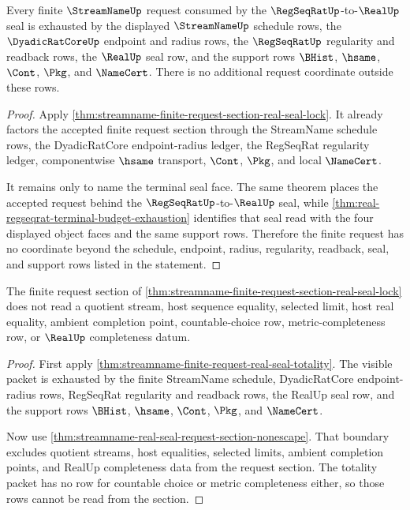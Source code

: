 \begin{theorem}
\label{thm:streamname-finite-request-real-seal-totality}
Every finite $\StreamNameUp$ request consumed by the
$\RegSeqRatUp$-to-$\RealUp$ seal is exhausted by the displayed
$\StreamNameUp$ schedule rows, the $\DyadicRatCoreUp$ endpoint and radius
rows, the $\RegSeqRatUp$ regularity and readback rows, the $\RealUp$ seal row,
and the support rows $\BHist$, $\hsame$, $\Cont$, $\Pkg$, and $\NameCert$.
There is no additional request coordinate outside these rows.
\end{theorem}
\begin{proof}
Apply \autoref{thm:streamname-finite-request-section-real-seal-lock}. It
already factors the accepted finite request section through the StreamName
schedule rows, the DyadicRatCore endpoint-radius ledger, the RegSeqRat
regularity ledger, componentwise $\hsame$ transport, $\Cont$, $\Pkg$, and
local $\NameCert$.

It remains only to name the terminal seal face. The same theorem places the
accepted request behind the $\RegSeqRatUp$-to-$\RealUp$ seal, while
\autoref{thm:real-regseqrat-terminal-budget-exhaustion} identifies that seal
read with the four displayed object faces and the same support rows.
Therefore the finite request has no coordinate beyond the schedule, endpoint,
radius, regularity, readback, seal, and support rows listed in the statement.
\end{proof}

\begin{theorem}
\label{thm:streamname-request-section-nonescape}
The finite request section of
\autoref{thm:streamname-finite-request-section-real-seal-lock} does not read a
quotient stream, host sequence equality, selected limit, host real equality,
ambient completion point, countable-choice row, metric-completeness row, or
$\RealUp$ completeness datum.
\end{theorem}
\begin{proof}
First apply
\autoref{thm:streamname-finite-request-real-seal-totality}. The visible packet
is exhausted by the finite StreamName schedule, DyadicRatCore endpoint-radius
rows, RegSeqRat regularity and readback rows, the RealUp seal row, and the
support rows $\BHist$, $\hsame$, $\Cont$, $\Pkg$, and $\NameCert$.

Now use
\autoref{thm:streamname-real-seal-request-section-nonescape}. That boundary
excludes quotient streams, host equalities, selected limits, ambient completion
points, and RealUp completeness data from the request section. The totality
packet has no row for countable choice or metric completeness either, so those
rows cannot be read from the section.
\end{proof}

